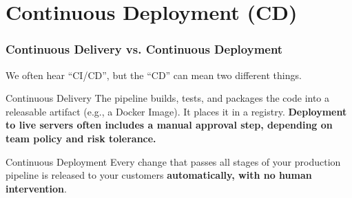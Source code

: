 \documentclass[xcolor=table]{beamer}
\begin{document}
\section{Continuous Deployment (CD)}

\begin{frame}
    \frametitle{Continuous Delivery vs. Continuous Deployment}
    We often hear ``CI/CD'', but the ``CD'' can mean two different things.
    
    \vspace{0.2cm}
    \begin{block}{Continuous Delivery}
        The pipeline builds, tests, and packages the code into a releasable artifact (e.g., a Docker Image). It places it in a registry. \textbf{Deployment to live servers often includes a manual approval step, depending on team policy and risk tolerance.}
    \end{block}
    
    \vspace{0.2cm}
    \begin{block}{Continuous Deployment}
        Every change that passes all stages of your production pipeline is released to your customers \textbf{automatically, with no human intervention}.
    \end{block}
\end{frame}
\end{document}

